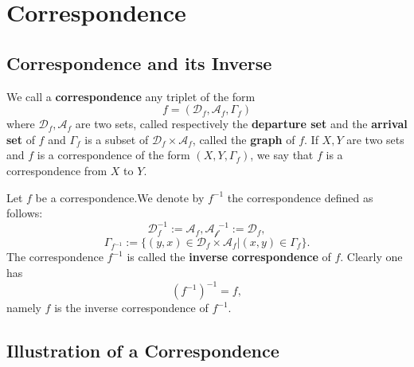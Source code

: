 \chapter{Correspondence}
\section{Correspondence and its Inverse}
\begin{definitionenv}
    We call a \textbf{correspondence} any triplet of the form $$f=(\mathscr{D} _f, \mathscr{A}_f, \Gamma_f)$$
    where $\mathscr{D}_f, \mathscr{A}_f$ are two sets,  called respectively the \textbf{departure set }  and the \textbf{arrival set} of $f$ and $\Gamma_f$ is a subset of $\mathscr{D}_f\times \mathscr{A}_f$,  called the \textbf{graph} of $f$.
    \newline
    If $X, Y$ are two sets and $f$ is a correspondence of the form $(X, Y, \Gamma_f)$, we say that $f$ is a correspondence from $X$ to $Y$. 
\end{definitionenv}
\begin{definitionenv}
    Let $f$ be a correspondence.We denote by $f^{-1}$ the correspondence defined as follows:
    $$\mathscr{D}_f^{-1}:=\mathscr{A}_f, \mathscr{A_f}^{-1}:=\mathscr{D}_f, $$
    $$\Gamma_{f^{-1}}:=\{(y, x)\in \mathscr{D}_f\times \mathscr{A}_f|(x, y)\in \Gamma_f\}.$$
    The correspondence $f^{-1}$ is called the \textbf{inverse correspondence} of $f$. Clearly one has $$(f^{-1})^{-1}=f, $$
    namely $f$ is the inverse correspondence of $f^{-1}$.
\end{definitionenv}
\section{Illustration of a Correspondence}
